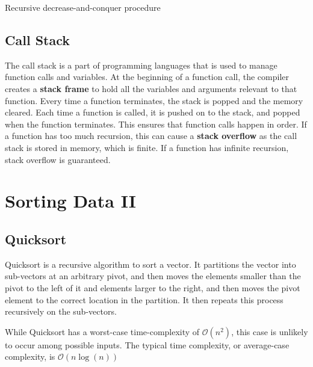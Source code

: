 \begin{algorithm}[H]
	\caption{Recursive decrease-and-conquer procedure}\label{alg:fact}
	\begin{algorithmic}
		\EndIf{}

		\EndFunction{}
	\end{algorithmic}
\end{algorithm}

\subsection{Call Stack}
The call stack is a part of programming languages that is used to manage function calls and variables. At the beginning of a function call, the compiler creates a \textbf{stack frame} to hold all the variables and arguments relevant to that function. Every time a function terminates, the stack is popped and the memory cleared. Each time a function is called, it is pushed on to the stack, and popped when the function terminates. This ensures that function calls happen in order.
If a function has too much recursion, this can cause a \textbf{stack overflow} as the call stack is stored in memory, which is finite. If a function has infinite recursion, stack overflow is guaranteed.

\section{Sorting Data II}
\subsection{Quicksort}
Quicksort is a recursive algorithm to sort a vector. It partitions the vector into sub-vectors at an arbitrary pivot, and then moves the elements smaller than the pivot to the left of it and elements larger to the right, and then moves the pivot element to the correct location in the partition. It then repeats this process recursively on the sub-vectors.

While Quicksort has a worst-case time-complexity of \( \mathcal{O}(n^2) \), this case is unlikely to occur among possible inputs. The typical time complexity, or average-case complexity, is \( \mathcal{O}(n \log(n)) \)

